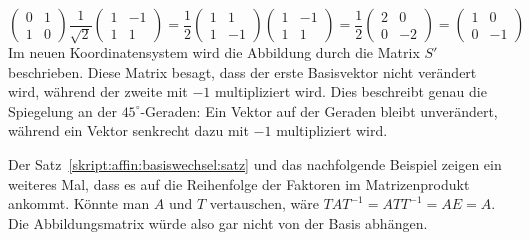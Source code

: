 \begin{beispiel}
\[\begin{pmatrix}
0&1\\1&0
\end{pmatrix}
\frac1{\sqrt{2}}\begin{pmatrix}
1&-1\\
1&1
\end{pmatrix}
=
\frac12
\begin{pmatrix}
1&1\\1&-1
\end{pmatrix}
\begin{pmatrix}
1&-1\\1&1
\end{pmatrix}
=
\frac12
\begin{pmatrix}
2&0\\0&-2
\end{pmatrix}
=
\begin{pmatrix}
1&0\\0&-1
\end{pmatrix}
\]
Im neuen Koordinatensystem wird die Abbildung durch die Matrix $S'$
beschrieben.
Diese Matrix besagt, dass der erste Basisvektor nicht verändert wird,
während der zweite mit $-1$ multipliziert wird.
Dies beschreibt genau die Spiegelung an der $45^\circ$-Geraden:
Ein Vektor auf der Geraden bleibt unverändert, während ein Vektor
senkrecht dazu mit $-1$ multipliziert wird.
\end{beispiel}

Der Satz~\ref{skript:affin:basiswechsel:satz} und das nachfolgende 
Beispiel zeigen ein weiteres Mal, dass es auf die Reihenfolge der
Faktoren im Matrizenprodukt ankommt.
Könnte man $A$ und $T$ vertauschen, wäre $TAT^{-1}=ATT^{-1}=AE=A$.
Die Abbildungsmatrix würde also gar nicht von der Basis abhängen.


